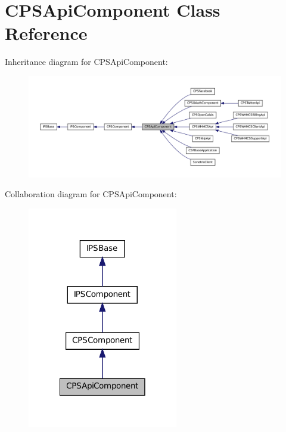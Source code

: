\hypertarget{classCPSApiComponent}{
\section{CPSApiComponent Class Reference}
\label{classCPSApiComponent}
}


Inheritance diagram for CPSApiComponent:\nopagebreak
\begin{figure}[H]
\begin{center}
\leavevmode
\includegraphics[width=400pt]{classCPSApiComponent__inherit__graph}
\end{center}
\end{figure}


Collaboration diagram for CPSApiComponent:\nopagebreak
\begin{figure}[H]
\begin{center}
\leavevmode
\includegraphics[width=186pt]{classCPSApiComponent__coll__graph}
\end{center}
\end{figure}
